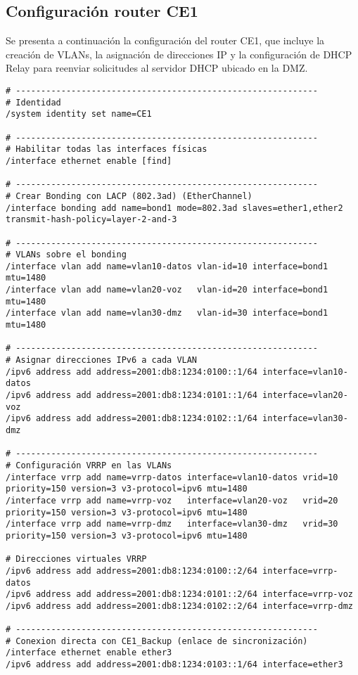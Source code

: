 \subsection{Configuración router CE1}
\label{Apendice2:configuracion_ce1}
Se presenta a continuación la configuración del router CE1, que incluye la creación de VLANs, la asignación de direcciones IP y la configuración de DHCP Relay para reenviar solicitudes al servidor DHCP ubicado en la DMZ.
\begin{lstlisting}[language=RouterOS]
# ------------------------------------------------------------
# Identidad
/system identity set name=CE1

# ------------------------------------------------------------
# Habilitar todas las interfaces físicas
/interface ethernet enable [find]

# ------------------------------------------------------------
# Crear Bonding con LACP (802.3ad) (EtherChannel)
/interface bonding add name=bond1 mode=802.3ad slaves=ether1,ether2 transmit-hash-policy=layer-2-and-3

# ------------------------------------------------------------
# VLANs sobre el bonding
/interface vlan add name=vlan10-datos vlan-id=10 interface=bond1 mtu=1480
/interface vlan add name=vlan20-voz   vlan-id=20 interface=bond1 mtu=1480
/interface vlan add name=vlan30-dmz   vlan-id=30 interface=bond1 mtu=1480

# ------------------------------------------------------------
# Asignar direcciones IPv6 a cada VLAN
/ipv6 address add address=2001:db8:1234:0100::1/64 interface=vlan10-datos
/ipv6 address add address=2001:db8:1234:0101::1/64 interface=vlan20-voz
/ipv6 address add address=2001:db8:1234:0102::1/64 interface=vlan30-dmz

# ------------------------------------------------------------
# Configuración VRRP en las VLANs
/interface vrrp add name=vrrp-datos interface=vlan10-datos vrid=10 priority=150 version=3 v3-protocol=ipv6 mtu=1480
/interface vrrp add name=vrrp-voz   interface=vlan20-voz   vrid=20 priority=150 version=3 v3-protocol=ipv6 mtu=1480
/interface vrrp add name=vrrp-dmz   interface=vlan30-dmz   vrid=30 priority=150 version=3 v3-protocol=ipv6 mtu=1480

# Direcciones virtuales VRRP
/ipv6 address add address=2001:db8:1234:0100::2/64 interface=vrrp-datos
/ipv6 address add address=2001:db8:1234:0101::2/64 interface=vrrp-voz
/ipv6 address add address=2001:db8:1234:0102::2/64 interface=vrrp-dmz

# ------------------------------------------------------------
# Conexion directa con CE1_Backup (enlace de sincronización)
/interface ethernet enable ether3
/ipv6 address add address=2001:db8:1234:0103::1/64 interface=ether3


\end{lstlisting}
